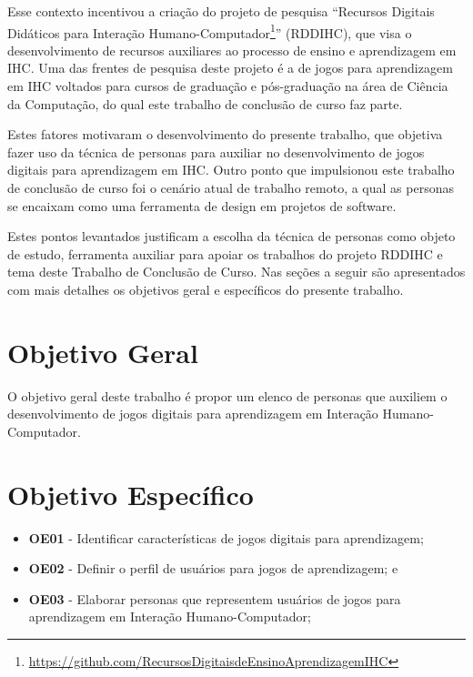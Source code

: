 Esse contexto incentivou a criação do projeto de pesquisa ``Recursos Digitais Didáticos para Interação Humano-Computador\footnote{\url{https://github.com/RecursosDigitaisdeEnsinoAprendizagemIHC}}'' (RDDIHC), que visa o desenvolvimento de recursos auxiliares ao processo de ensino e aprendizagem em IHC. Uma das frentes de pesquisa deste projeto é a de jogos para aprendizagem em IHC voltados para cursos de graduação e pós-graduação na área de Ciência da Computação, do qual este trabalho de conclusão de curso faz parte.

Estes fatores motivaram o desenvolvimento do presente trabalho, que objetiva fazer uso da técnica de personas para auxiliar no desenvolvimento de jogos digitais para aprendizagem em IHC. Outro ponto que impulsionou este trabalho de conclusão de curso foi o cenário atual de trabalho remoto, a qual as personas se encaixam como uma ferramenta de design em projetos de software.

Estes pontos levantados justificam a escolha da técnica de personas como objeto de estudo, ferramenta auxiliar para apoiar os trabalhos do projeto RDDIHC e tema deste Trabalho de Conclusão de Curso. Nas seções a seguir são apresentados com mais detalhes os objetivos geral e específicos do presente trabalho.


\section{Objetivo Geral}
\label{sec:objetivos}

O objetivo geral deste trabalho é propor um elenco de personas que auxiliem o desenvolvimento de jogos digitais para aprendizagem em Interação Humano-Computador.

\section{Objetivo Específico}
\label{ssec:obj_especifico}
\begin{itemize}

    
     \item \textbf{OE01} - Identificar características de jogos digitais para aprendizagem;
     
     \item \textbf{OE02} - Definir o perfil de usuários para jogos de aprendizagem; e
    
    \item \textbf{OE03} - Elaborar personas que representem usuários de jogos para aprendizagem em Interação Humano-Computador;
    
\end{itemize}

